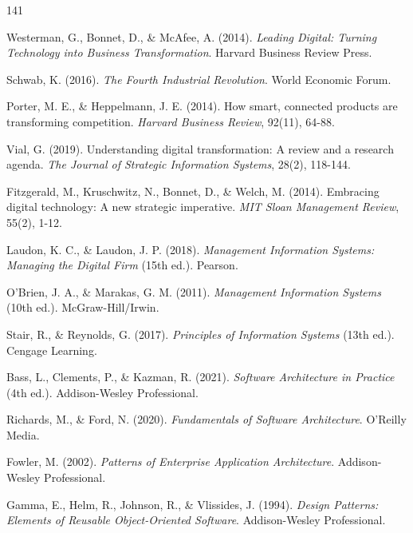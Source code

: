 \begin{thebibliography}{141}

Westerman, G., Bonnet, D., \& McAfee, A. (2014). \textit{Leading Digital: Turning Technology into Business Transformation}. Harvard Business Review Press.

Schwab, K. (2016). \textit{The Fourth Industrial Revolution}. World Economic Forum.

Porter, M. E., \& Heppelmann, J. E. (2014). How smart, connected products are transforming competition. \textit{Harvard Business Review}, 92(11), 64-88.

Vial, G. (2019). Understanding digital transformation: A review and a research agenda. \textit{The Journal of Strategic Information Systems}, 28(2), 118-144.

Fitzgerald, M., Kruschwitz, N., Bonnet, D., \& Welch, M. (2014). Embracing digital technology: A new strategic imperative. \textit{MIT Sloan Management Review}, 55(2), 1-12.


Laudon, K. C., \& Laudon, J. P. (2018). \textit{Management Information Systems: Managing the Digital Firm} (15th ed.). Pearson.

O'Brien, J. A., \& Marakas, G. M. (2011). \textit{Management Information Systems} (10th ed.). McGraw-Hill/Irwin.

Stair, R., \& Reynolds, G. (2017). \textit{Principles of Information Systems} (13th ed.). Cengage Learning.


Bass, L., Clements, P., \& Kazman, R. (2021). \textit{Software Architecture in Practice} (4th ed.). Addison-Wesley Professional.

Richards, M., \& Ford, N. (2020). \textit{Fundamentals of Software Architecture}. O'Reilly Media.

Fowler, M. (2002). \textit{Patterns of Enterprise Application Architecture}. Addison-Wesley Professional.

Gamma, E., Helm, R., Johnson, R., \& Vlissides, J. (1994). \textit{Design Patterns: Elements of Reusable Object-Oriented Software}. Addison-Wesley Professional.


\end{thebibliography}

